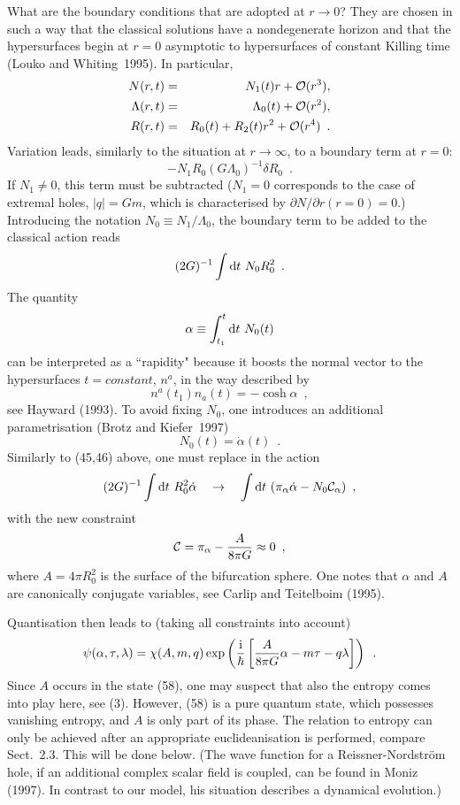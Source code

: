 \documentclass[12pt]{article}
\def\D{{\rm d}}
\def\I{{\rm i}}
\newcommand{\be}{\begin{equation}}
\newcommand{\ee}{\end{equation}}
\newcommand{\bea}{\begin{eqnarray}}
\newcommand{\eea}{\end{eqnarray}}
\begin{document}
What are the boundary conditions that are adopted at
$r\to 0$? They are chosen in such a way that the classical
solutions have a nondegenerate horizon and that the hypersurfaces
begin at $r=0$ asymptotic to hypersurfaces of constant
Killing time (Louko and Whiting~1995).
In particular, 
\bea N(r,t) &=& N_1(t)r+{\cal O}(r^3), \\
     \Lambda(r,t) &=& \Lambda_0(t)+ {\cal O}(r^2), \\
     R(r,t) &=& R_0(t)+R_2(t)r^2 +{\cal O}(r^4) \enspace . \eea
Variation leads, similarly to 
the situation at $r\to\infty$, to a boundary term at $r=0$:
\[ -N_1R_0(G\Lambda_0)^{-1}\delta R_0 \enspace . \]
If $N_1\neq0$, this term must be subtracted 
($N_1=0$ corresponds to the case of extremal holes,
$\vert q\vert=Gm$, which is characterised by 
$\partial N/\partial r(r=0)=0$.)
Introducing the notation $N_0\equiv N_1/\Lambda_0$, the boundary term
to be added to the classical action reads
\[  (2G)^{-1}\int\D t\ N_0R_0^2 \enspace . \]
The quantity
\be \alpha\equiv \int_{t_1}^{t}\D t\ N_0(t) \ee
can be interpreted as a ``rapidity" because it boosts the normal vector
to the hypersurfaces $t=constant$, $n^{a}$, in the way described by
\be n^{a}(t_1)n_a(t)=-\cosh\alpha \enspace , \ee
see Hayward (1993). To avoid fixing $N_0$, one introduces
an additional parametrisation (Brotz and Kiefer~1997)
\be N_0(t)=\dot{\alpha}(t) \enspace . \ee
Similarly to (45,46) above, one must replace in the action
\be (2G)^{-1}\int\D t\ R_0^2\dot{\alpha} \quad \to \quad
     \int\D t\ (\pi_{\alpha}\dot{\alpha}-N_0{\cal C}_{\alpha})
     \enspace , \ee
with the new constraint
\be {\cal C}=\pi_{\alpha}-\frac{A}{8\pi G} \approx 0 \enspace , \ee
where $A=4\pi R_0^2$ is the surface of the bifurcation sphere.
One notes that $\alpha$ and $A$ are canonically conjugate
variables, see Carlip and Teitelboim (1995).

Quantisation then leads to (taking all constraints into account)
\be \psi(\alpha,\tau,\lambda)= \chi(A,m,q)
    \exp\left(\frac{\I}{\hbar}\left[\frac{A}{8\pi G}\alpha
     -m\tau-q\lambda\right]\right) \enspace . \ee
Since $A$ occurs in the state (58), one may suspect that also
the entropy comes into play here, see (3). However, (58) is a pure
quantum state, which possesses vanishing entropy, and
$A$ is only part of its phase. The relation to entropy can only be
achieved after an appropriate euclideanisation is performed, compare
Sect.~2.3. This will be done below.
(The wave function for a Reissner-Nordstr\"om hole, if an
additional complex scalar field is coupled, can be found
in Moniz (1997). In contrast to our model, his situation
describes a dynamical evolution.)
\end{document}
